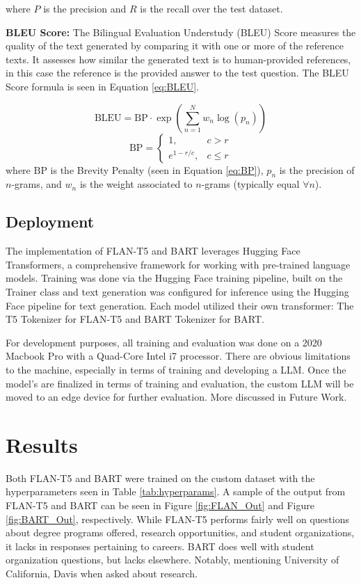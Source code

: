 \documentclass[conference]{IEEEtran}
\begin{document}
\noindent
where $P$ is the precision and $R$ is the recall over the test dataset. 

\noindent
\textbf{BLEU Score:}
The Bilingual Evaluation Understudy (BLEU) Score measures the quality of the text generated by comparing it with one or more of the reference texts.
It assesses how similar the generated text is to human-provided references, in this case the reference is the provided answer to the test question. 
The BLEU Score formula is seen in Equation \ref{eq:BLEU}.

\begin{equation} \label{eq:BLEU}
    \text{BLEU} = \text{BP} \cdot \exp \left( \sum_{n=1}^{N} w_n \log(p_n) \right)
\end{equation}
\begin{equation} \label{eq:BP}
    \text{BP} = 
    \begin{cases}
        1, & c > r \\
        e^{1 - r/c}, & c \leq r
    \end{cases}
\end{equation}
\noindent
where $\text{BP}$ is the Brevity Penalty (seen in Equation \ref{eq:BP}), $p_n$ is the precision of $n$-grams, and $w_n$ is the weight associated to $n$-grams (typically equal $\forall n$).

\subsection{Deployment}
The implementation of FLAN-T5 and BART leverages Hugging Face Transformers, a comprehensive framework for working with pre-trained language models.
Training was done via the Hugging Face training pipeline, built on the Trainer class and text generation was configured for inference using the Hugging Face pipeline for text generation.
Each model utilized their own transformer: The T5 Tokenizer \cite{b9} for FLAN-T5 and BART Tokenizer \cite{b10} for BART.

For development purposes, all training and evaluation was done on a 2020 Macbook Pro with a Quad-Core Intel i7 processor. 
There are obvious limitations to the machine, especially in terms of training and developing a LLM. 
Once the model's are finalized in terms of training and evaluation, the custom LLM will be moved to an edge device for further evaluation. More discussed in Future Work.

\section{Results}
Both FLAN-T5 and BART were trained on the custom dataset with the hyperparameters seen in Table \ref{tab:hyperparams}. 
A sample of the output from FLAN-T5 and BART can be seen in Figure \ref{fig:FLAN_Out} and Figure \ref{fig:BART_Out}, respectively.
While FLAN-T5 performs fairly well on questions about degree programs offered, research opportunities, and student organizations, it lacks in responses pertaining to careers.
BART does well with student organization questions, but lacks elsewhere. Notably, mentioning University of California, Davis when asked about research. 
\end{document}
